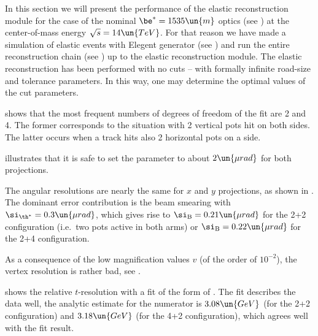 In this section we will present the performance of the elastic reconstruction module for the case of the nominal $\be^* = 1535\un{m}$ optics (see ) at the center-of-mass energy $\sqrt s = 14\un{TeV}$. For that reason we have made a  simulation of elastic events with Elegent generator (see ) and run the entire reconstruction chain (see ) up to the elastic reconstruction module. The elastic reconstruction has been performed with no cuts -- with formally infinite road-size and tolerance parameters. In this way, one may determine the optimal values of the cut parameters.

 shows that the most frequent numbers of degrees of freedom of the fit  are 2 and 4. The former corresponds to the situation with 2 vertical pots hit on both sides. The latter occurs when a track hits also 2 horizontal pots on a side.

 illustrates that it is safe to set the  parameter to about $2\un{\mu rad}$ for both projections.

\bmfig
{}
\emfig

The angular resolutions are nearly the same for $x$ and $y$ projections, as shown in . The dominant error contribution is the beam smearing with $\si_{\th^*} = 0.3\un{\mu rad}$, which gives rise to $\si_{\rm B} = 0.21 \un{\mu rad}$ for the 2+2 configuration (i.e.~two pots active in both arms) or $\si_{\rm B} = 0.22\un{\mu rad}$ for the 2+4 configuration.

As a consequence of the low magnification values $v$ (of the order of $10^{-2}$), the vertex resolution is rather bad, see .

\bmfig
{}
\emfig

 shows the relative $t$-resolution with a fit of the form of . The fit describes the data well, the analytic estimate for the numerator is $3.08\un{GeV}$ (for the 2+2 configuration) and $3.18\un{GeV}$ (for the 4+2 configuration), which agrees well with the fit result.

